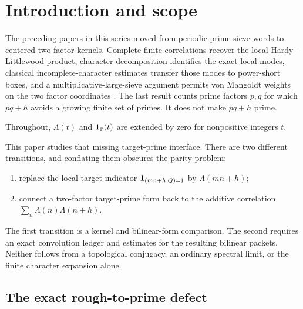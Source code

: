 \section{Introduction and scope}\label{sec:introduction}

The preceding papers in this series moved from periodic prime-sieve words to
centered two-factor kernels.  Complete finite correlations recover the local
Hardy--Littlewood product, character decomposition identifies the exact local
modes, classical incomplete-character estimates transfer those modes to
power-short boxes, and a multiplicative-large-sieve argument permits von
Mangoldt weights on the two factor coordinates
\citep{WangTPCOne2026,WangTPCTwo2026,WangTPCThree2026,WangTPCFour2026,WangTPCFive2026}.
The last result counts prime factors $p,q$ for which $pq+h$ avoids a growing
finite set of primes.  It does not make $pq+h$ prime.

Throughout, $\Lambda(t)$ and $\mathbf 1_{\mathbb P}(t)$ are extended by zero for
nonpositive integers $t$.

This paper studies that missing target-prime interface.  There are two
different transitions, and conflating them obscures the parity problem:
\begin{enumerate}[label=\textbf{T\arabic*.},leftmargin=3.2em]
 \item replace the local target indicator $\mathbf 1_{(mn+h,Q)=1}$ by
 $\Lambda(mn+h)$;
 \item connect a two-factor target-prime form back to the additive
 correlation $\sum_n\Lambda(n)\Lambda(n+h)$.
\end{enumerate}
The first transition is a kernel and bilinear-form comparison.  The second requires an
exact convolution ledger and estimates for the resulting bilinear packets.
Neither follows from a topological conjugacy, an ordinary spectral limit, or
the finite character expansion alone.

\subsection{The exact rough-to-prime defect}

